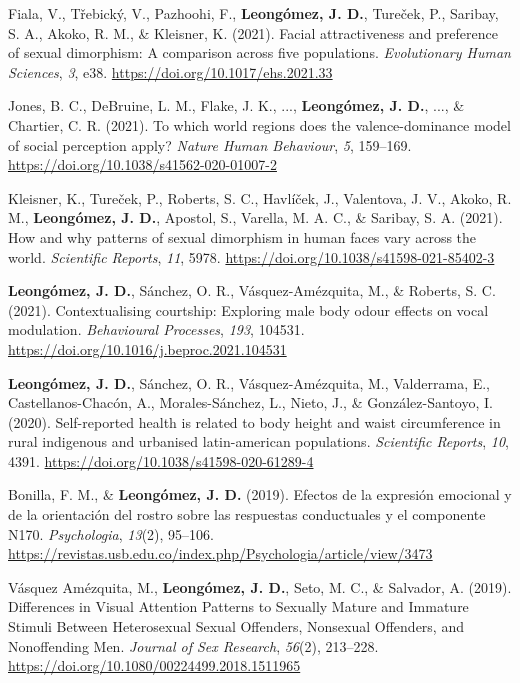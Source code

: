 \documentclass[11pt, a4paper]{awesome-cv}
\begin{document}
\leavevmode{}%
Fiala, V., Třebický, V., Pazhoohi, F., \textbf{Leongómez, J. D.},
Tureček, P., Saribay, S. A., Akoko, R. M., \& Kleisner, K. (2021).
Facial attractiveness and preference of sexual dimorphism: A comparison
across five populations. \emph{Evolutionary Human Sciences}, \emph{3},
e38. \url{https://doi.org/10.1017/ehs.2021.33}

\leavevmode{}%
Jones, B. C., DeBruine, L. M., Flake, J. K., ...,
\textbf{Leongómez, J. D.}, ..., \& Chartier, C. R. (2021). {To which
world regions does the valence-dominance model of social perception
apply?} \emph{Nature Human Behaviour}, \emph{5}, 159--169.
\url{https://doi.org/10.1038/s41562-020-01007-2}

\leavevmode{}%
Kleisner, K., Tureček, P., Roberts, S. C., Havlíček, J., Valentova, J.
V., Akoko, R. M., \textbf{Leongómez, J. D.}, Apostol, S., Varella, M. A.
C., \& Saribay, S. A. (2021). How and why patterns of sexual dimorphism
in human faces vary across the world. \emph{Scientific Reports},
\emph{11}, 5978. \url{https://doi.org/10.1038/s41598-021-85402-3}

\leavevmode{}%
\textbf{Leongómez, J. D.}, Sánchez, O. R., Vásquez-Amézquita, M., \&
Roberts, S. C. (2021). Contextualising courtship: Exploring male body
odour effects on vocal modulation. \emph{Behavioural Processes},
\emph{193}, 104531. \url{https://doi.org/10.1016/j.beproc.2021.104531}

\leavevmode{}%
\textbf{Leongómez, J. D.}, Sánchez, O. R., Vásquez-Amézquita, M.,
Valderrama, E., Castellanos-Chacón, A., Morales-Sánchez, L., Nieto, J.,
\& González-Santoyo, I. (2020). Self-reported health is related to body
height and waist circumference in rural indigenous and urbanised
latin-american populations. \emph{Scientific Reports}, \emph{10}, 4391.
\url{https://doi.org/10.1038/s41598-020-61289-4}

\leavevmode{}%
Bonilla, F. M., \& \textbf{Leongómez, J. D.} (2019). {Efectos de la
expresi{ó}n emocional y de la orientaci{ó}n del rostro sobre las
respuestas conductuales y el componente N170}. \emph{Psychologia},
\emph{13}(2), 95--106.
\url{https://revistas.usb.edu.co/index.php/Psychologia/article/view/3473}

\leavevmode{}%
Vásquez Amézquita, M., \textbf{Leongómez, J. D.}, Seto, M. C., \&
Salvador, A. (2019). {Differences in Visual Attention Patterns to
Sexually Mature and Immature Stimuli Between Heterosexual Sexual
Offenders, Nonsexual Offenders, and Nonoffending Men}. \emph{Journal of
Sex Research}, \emph{56}(2), 213--228.
\url{https://doi.org/10.1080/00224499.2018.1511965}
\end{document}
